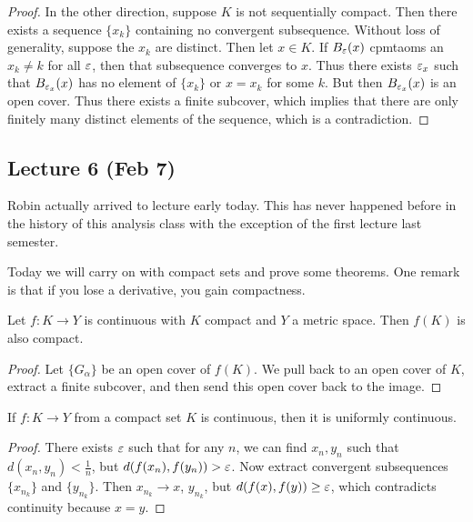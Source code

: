 \documentclass[10pt, twoside]{article}
\begin{document}
\begin{thm}
\begin{proof}
            In the other direction, suppose $K$ is not sequentially compact.
        Then there exists a sequence $\{x_k\}$ containing no convergent
    subsequence. Without loss of generality, suppose the $x_k$ are distinct.
Then let $x \in K$. If $B_{\varepsilon}(x)$ cpmtaoms an $x_k \neq k$ for all $\varepsilon$,
then that subsequence converges to $x$. Thus there exists $\varepsilon_x$ such that
$B_{\varepsilon_x}(x)$ has no element of $\{x_k\}$ or $x = x_k$ for some $k$. But then
$B_{\varepsilon_x}(x)$ is an open cover. Thus there exists a finite subcover, which
implies that there are only finitely many distinct elements of the sequence,
which is a contradiction.  \end{proof} \end{thm}

    \subsection{Lecture 6 (Feb 7)} Robin actually arrived to lecture early
    today. This has never happened before in the history of this analysis class
    with the exception of the first lecture last semester.

    Today we will carry on with compact sets and prove some theorems. One
    remark is that if you lose a derivative, you gain compactness. 

    \begin{thm} Let $f : K \rightarrow Y$ is continuous with $K$ compact and
        $Y$ a metric space. Then $f(K)$ is also compact.  \begin{proof} Let
            $\{G_{\alpha}\}$ be an open cover of $f(K)$. We pull back to an
            open cover of $K$, extract a finite subcover, and then send this
            open cover back to the image.  \end{proof} \end{thm}

    \begin{thm} If $f: K \rightarrow Y$ from a compact set $K$ is continuous,
        then it is uniformly continuous.  \begin{proof} There exists $\varepsilon$ such
            that for any $n$, we can find $x_n,y_n$ such that $d(x_n,y_n) <
            \frac{1}{n}$, but $d(f(x_n), f(y_n)) > \varepsilon$. Now extract convergent
            subsequences $\{x_{n_k}\}$ and $\{y_{n_k}\}$. Then $x_{n_k}
            \rightarrow x$, $y_{n_k}$, but $d(f(x), f(y)) \geq \varepsilon$, which
            contradicts continuity because $x = y$.  \end{proof} \end{thm}
\end{document}
